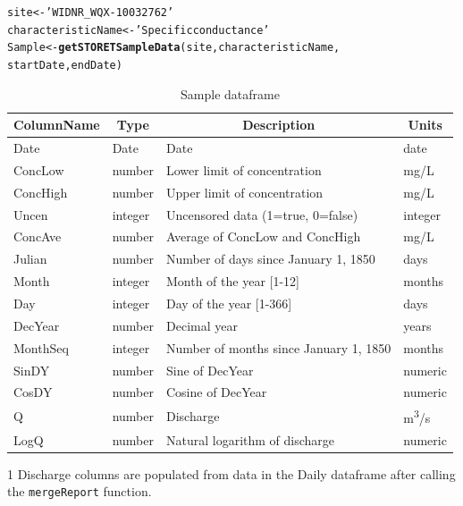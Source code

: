 \documentclass[a4paper,11pt]{article}\usepackage[]{graphicx}\usepackage[]{color}
\makeatletter
\newcommand{\hlstr}[1]{\textcolor[rgb]{0.192,0.494,0.8}{#1}}%
\newcommand{\hlstd}[1]{\textcolor[rgb]{0.345,0.345,0.345}{#1}}%
\newcommand{\hlkwb}[1]{\textcolor[rgb]{0.69,0.353,0.396}{#1}}%
\newcommand{\hlkwd}[1]{\textcolor[rgb]{0.737,0.353,0.396}{\textbf{#1}}}%
\newenvironment{kframe}{%
 \def\at@end@of@kframe{}%
 \ifinner\ifhmode%
  \def\at@end@of@kframe{\end{minipage}}%
  \begin{minipage}{\columnwidth}%
 \fi\fi%
 \def\FrameCommand##1{\hskip\@totalleftmargin \hskip-\fboxsep
 \colorbox{shadecolor}{##1}\hskip-\fboxsep
     \hskip-\linewidth \hskip-\@totalleftmargin \hskip\columnwidth}%
 \MakeFramed {\advance\hsize-\width
   \@totalleftmargin\z@ \linewidth\hsize
   \@setminipage}}%
 {\par\unskip\endMakeFramed%
 \at@end@of@kframe}
\newenvironment{knitrout}{}{} %
\makeatother
\begin{document}
\begin{knitrout}
\color{fgcolor}\begin{kframe}
\begin{alltt}
\hlstd{site} \hlkwb{<-} \hlstr{'WIDNR_WQX-10032762'}
\hlstd{characteristicName} \hlkwb{<-} \hlstr{'Specific conductance'}
\hlstd{Sample} \hlkwb{<-}\hlkwd{getSTORETSampleData}\hlstd{(site,characteristicName,}
      \hlstd{startDate, endDate)}
\end{alltt}
\end{kframe}
\end{knitrout}


\pagebreak


\begin{table}
{\footnotesize
  \begin{threeparttable}[b]
  \caption{Sample dataframe}
  \label{tab:SampleDataframe}
  \begin{tabular}{llll}
  \hline
\multicolumn{1}{c}{\textbf{\textsf{ColumnName}}} & 
\multicolumn{1}{c}{\textbf{\textsf{Type}}} & 
\multicolumn{1}{c}{\textbf{\textsf{Description}}} & 
\multicolumn{1}{c}{\textbf{\textsf{Units}}} \\ 
  \hline
  Date & Date & Date & date \\ 
  [5pt]ConcLow & number & Lower limit of concentration & mg/L \\ 
  [5pt]ConcHigh & number & Upper limit of concentration & mg/L \\ 
  [5pt]Uncen & integer & Uncensored data (1=true, 0=false) & integer \\ 
  [5pt]ConcAve & number & Average of ConcLow and ConcHigh & mg/L \\ 
  [5pt]Julian & number & Number of days since January 1, 1850 & days \\ 
  [5pt]Month & integer & Month of the year [1-12] & months \\ 
  [5pt]Day & integer & Day of the year [1-366] & days \\ 
  [5pt]DecYear & number & Decimal year & years \\ 
  [5pt]MonthSeq & integer & Number of months since January 1, 1850 & months \\ 
  [5pt]SinDY & number & Sine of DecYear & numeric \\ 
  [5pt]CosDY & number & Cosine of DecYear & numeric \\ 
  [5pt]Q \tnote{1} & number & Discharge & m\textsuperscript{3}/s \\ 
  [5pt]LogQ \tnote{1} & number & Natural logarithm of discharge & numeric \\ 
   \hline
\end{tabular}

  \begin{tablenotes}
    \item[1] Discharge columns are populated from data in the Daily dataframe after calling the \texttt{mergeReport} function.
  \end{tablenotes}
 \end{threeparttable}
}
\end{table}
\end{document}
